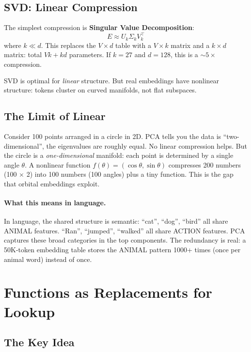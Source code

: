 \documentclass[11pt, a4paper]{article}
\theoremstyle{remark}
\begin{document}
\subsection{SVD: Linear Compression}

The simplest compression is \textbf{Singular Value Decomposition}:
\[
    E \approx U_k \Sigma_k V_k^\top
\]
where $k \ll d$.
This replaces the $V \times d$ table with a $V \times k$ matrix and a $k \times d$ matrix: total $V k + k d$ parameters.
If $k = 27$ and $d = 128$, this is a $\sim 5\times$ compression.

SVD is optimal for \emph{linear} structure.
But real embeddings have nonlinear structure: tokens cluster on curved manifolds, not flat subspaces.

\subsection{The Limit of Linear}

Consider 100 points arranged in a circle in 2D.
PCA tells you the data is ``two-dimensional'', the eigenvalues are roughly equal.
No linear compression helps.
But the circle is a \emph{one-dimensional} manifold: each point is determined by a single angle $\theta$.
A nonlinear function $f(\theta) = (\cos\theta, \sin\theta)$ compresses 200 numbers (100 $\times$ 2) into 100 numbers (100 angles) plus a tiny function.
This is the gap that orbital embeddings exploit.

\paragraph{What this means in language.}
In language, the shared structure is semantic: ``cat'', ``dog'', ``bird'' all share ANIMAL features.
``Ran'', ``jumped'', ``walked'' all share ACTION features.
PCA captures these broad categories in the top components.
The redundancy is real: a 50K-token embedding table stores the ANIMAL pattern 1000+ times (once per animal word) instead of once.


\section{Functions as Replacements for Lookup}
\label{sec:functions}

\subsection{The Key Idea}
\end{document}
